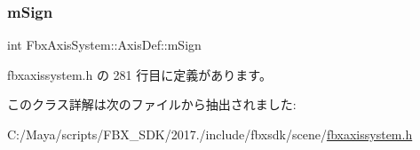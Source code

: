 \mbox{\label{class_fbx_axis_system_1_1_axis_def_a3d7254aed9f2e6a7ffa2b30e7234dbc0}} 
\subsubsection{\texorpdfstring{m\+Sign}{mSign}}
{\footnotesize\ttfamily int Fbx\+Axis\+System\+::\+Axis\+Def\+::m\+Sign}



 fbxaxissystem.\+h の 281 行目に定義があります。



このクラス詳解は次のファイルから抽出されました\+:\begin{DoxyCompactItemize}
\item 
C\+:/\+Maya/scripts/\+F\+B\+X\+\_\+\+S\+D\+K/2017./include/fbxsdk/scene/\hyperlink{fbxaxissystem_8h}{fbxaxissystem.\+h}\end{DoxyCompactItemize}
